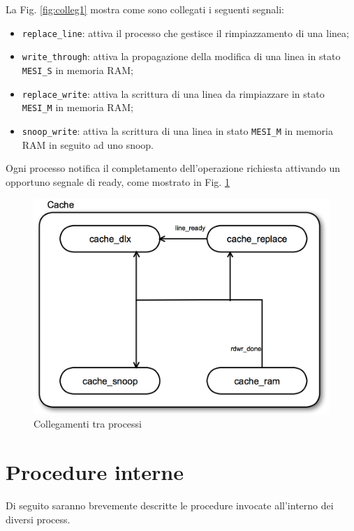 La Fig. \ref{fig:colleg1} mostra come sono collegati i seguenti segnali:
\begin{itemize}
  \item \texttt{replace\_line}: attiva il processo che gestisce il rimpiazzamento di una linea;
  \item \texttt{write\_through}: attiva la propagazione della modifica di una linea in stato \texttt{MESI\_S} in memoria RAM;
  \item \texttt{replace\_write}: attiva la scrittura di una linea da rimpiazzare in stato \texttt{MESI\_M} in memoria RAM;
  \item \texttt{snoop\_write}: attiva la scrittura di una linea in stato \texttt{MESI\_M} in memoria RAM in seguito ad uno snoop.
\end{itemize}

Ogni processo notifica il completamento dell'operazione richiesta attivando un opportuno segnale di ready, come mostrato in Fig. \ref{fig:colleg2}

\begin{figure}[h!]
\centering
\includegraphics[width=\textwidth]{img/cache/collegamenti2.png}
\caption{Collegamenti tra processi}
\label{fig:colleg2}
\end{figure}


\section{Procedure interne}

Di seguito saranno brevemente descritte le procedure invocate all'interno dei diversi process.%

